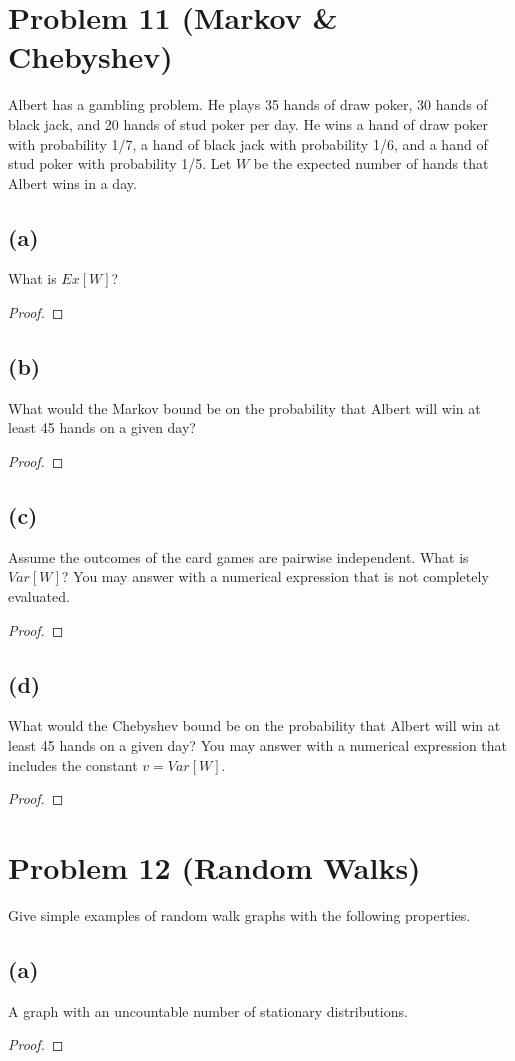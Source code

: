 \documentclass[14pt]{extarticle}
\begin{document}
\section{Problem 11 (Markov \& Chebyshev)}
Albert has a gambling problem. He plays 35 hands of draw poker, 30 hands of black jack, and 20 hands of stud poker per day. He wins a hand of draw poker with probability 1/7, a hand of black jack with probability 1/6, and a hand of stud poker with probability 1/5. Let $W$ be the expected number of hands that Albert wins in a day.
\subsection{(a)}
What is $Ex[W ]$?
\begin{proof}
\end{proof}

\subsection{(b)}
What would the Markov bound be on the probability that Albert will win at least 45 hands on a given day?
\begin{proof}
\end{proof}

\subsection{(c)}
Assume the outcomes of the card games are pairwise independent. What is $Var[W ]$? You may answer with a numerical expression that is not completely evaluated.
\begin{proof}
\end{proof}

\subsection{(d)}
What would the Chebyshev bound be on the probability that Albert will win at least 45 hands on a given day? You may answer with a numerical expression that includes the constant $v = Var[W ]$.
\begin{proof}
\end{proof}

\section{Problem 12 (Random Walks)}
Give simple examples of random walk graphs with the following properties.
\subsection{(a)}
A graph with an uncountable number of stationary distributions.
\begin{proof}
\end{proof}
\end{document}
